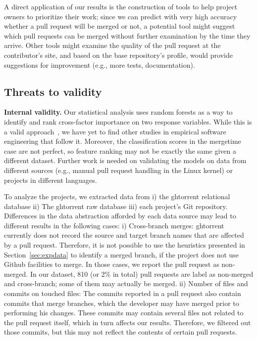 \documentclass{sig-alternate}
\begin{document}

A direct application of our results is the construction of tools to help project owners to prioritize their work; since we can predict
with very high accuracy whether a pull request will be merged or not, a
potential tool might suggest which pull requests can be merged without further
examination by the time they arrive. Other tools might examine the quality of
the pull request at the contributor's site, and based on the base repository's
profile, would provide suggestions for improvement (e.g., more tests,
documentation). 

\subsection{Threats to validity}

\textbf{Internal validity.} Our statistical analysis uses random forests as a way
to identify and rank cross-factor importance on two response variables. While
this is a valid approach~\cite{Genue10}, we have yet to find other studies in
empirical software engineering that follow it. Moreover, the classification
scores in the \textsf{mergetime} case are not perfect, so feature ranking may
not be exactly the same given a different dataset. Further work is needed on
validating the models on data from different sources (e.g., manual pull
request handling in the Linux kernel) or projects in different languages. 

To analyze the projects, we extracted data from i) the {\sc ght}orrent relational
database ii) The {\sc ght}orrent raw database iii) each project's Git repository.
Differences in the data abstraction afforded by each data source may
lead to different results in the following cases: 
i) Cross-branch merges: {\sc ght}orrent currently does not record the source
    and target branch names that are affected by a pull request. Therefore, it
    is not possible to use the heuristics presented in
    Section~\ref{sec:expdata} to identify a merged branch, if the project
    does not use Github facilities to merge. In those cases, we
    report the pull request as non-merged. In our dataset, 810 (or 2\% in total)
    pull requests are label as non-merged and cross-branch; some of them may
    actually be merged.
ii) Number of files and commits on touched files: The commits reported
    in a pull request also contain commits that merge branches, which the
    developer may have merged prior to performing his changes. These commits
    may contain several files not related to the pull request itself, which
    in turn affects our results. Therefore, we  
    filtered out those commits, but this may not reflect the contents of 
    certain pull requests.
\end{document}
